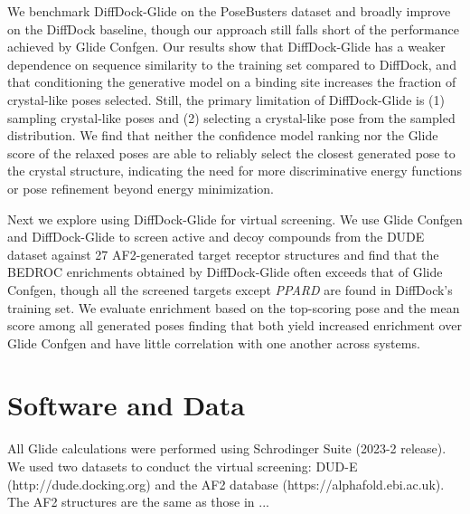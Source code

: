 \documentclass[%
 aip,
 amsmath,amssymb,
 reprint,%
]{revtex4-1}
\newcommand{\lh}[1]{{\color{blue}{#1}}}
\begin{document}
We benchmark DiffDock-Glide on the PoseBusters dataset and broadly improve on the DiffDock baseline, though our approach still falls short of the performance achieved by Glide Confgen. Our results show that DiffDock-Glide has a weaker dependence on sequence similarity to the training set compared to DiffDock, and that conditioning the generative model on a binding site increases the fraction of crystal-like poses selected. Still, the primary limitation of DiffDock-Glide is (1) sampling crystal-like poses and (2) selecting a crystal-like pose from the sampled distribution. We find that neither the confidence model ranking nor the Glide score of the relaxed poses are able to reliably select the closest generated pose to the crystal structure, indicating the need for more discriminative energy functions or pose refinement beyond energy minimization.

Next we explore using DiffDock-Glide for virtual screening. We use Glide Confgen and DiffDock-Glide to screen active and decoy compounds from the DUDE dataset against 27 AF2-generated target receptor structures and find that the BEDROC enrichments obtained by DiffDock-Glide often exceeds that of Glide Confgen, though all the screened targets except {\it PPARD} are found in DiffDock's training set. We evaluate enrichment based on the top-scoring pose and the mean score among all generated poses finding that both yield increased enrichment over Glide Confgen and have little correlation with one another across systems.

\lh{Recommended use case: cryptic pockets}

\lh{Examine ligand cores in depth for one DUDE target.}




\section{Software and Data}

All Glide calculations were performed using Schrodinger Suite (2023-2 release). We used two datasets to conduct the virtual screening: DUD-E 
(http://dude.docking.org) and the AF2 database (https://alphafold.ebi.ac.uk). The AF2 structures are the same as those in \cite{zhang2023benchmarking}... 

\clearpage
\end{document}
